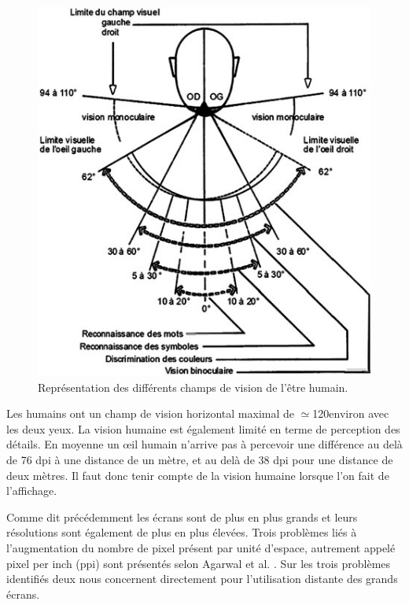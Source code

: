 \begin{figure}[!ht]
	\center	
	\includegraphics[scale=0.4]{image/acuite.jpg}
	\caption{Représentation des différents champs de vision de l'être humain.}
	\label{fig:acuite}
\end{figure}
Les humains ont un champ de vision horizontal maximal de $\simeq$120\degres  environ avec les deux yeux. La vision humaine est également limité en terme de perception des détails. En moyenne un œil humain n'arrive pas à percevoir une différence au delà de 76 dpi à une distance de un mètre, et au delà de 38 dpi pour une distance de deux mètres. Il faut donc tenir compte de la vision humaine lorsque l'on fait de l'affichage.



Comme dit précédemment les écrans sont de plus en plus grands et leurs résolutions sont également de plus en plus élevées. Trois problèmes liés à l'augmentation du nombre de pixel présent par unité d'espace, autrement appelé pixel per inch (ppi) sont présentés selon Agarwal et al. \cite{Agarwal:2013:WSA:2578048.2578052}. Sur les trois problèmes identifiés deux nous concernent directement pour l'utilisation distante des grands écrans.

